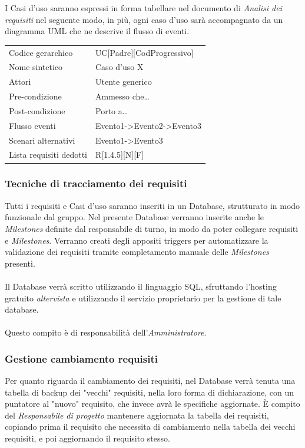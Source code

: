 \documentclass[a4paper]{article}
\begin{document}
			 I Casi d'uso saranno espressi in forma tabellare nel documento di \emph{Analisi dei requisiti}
			 nel seguente modo, in più, ogni caso d'uso sarà accompagnato da un diagramma UML che ne
			 descrive il flusso di eventi.
			 \begin{table}[H]
				\begin{tabularx}{\textwidth}{X | X}\toprule
					\rowcolor{orange!65}Codice gerarchico & UC[Padre][CodProgressivo] \\
					Nome sintetico & Caso d'uso X \\
					\rowcolor{orange!65}Attori & Utente generico\\
					Pre-condizione & Ammesso che\dots \\
					\rowcolor{orange!65}Post-condizione & Porto a\dots \\
					Flusso eventi & Evento1->Evento2->Evento3\\
					\rowcolor{orange!65}Scenari alternativi & Evento1->Evento3\\
					Lista requisiti dedotti & R[1.4.5][N][F]\\
					\bottomrule
				\end{tabularx}
			 \end{table}

		\subsubsection{Tecniche di tracciamento dei requisiti}
			Tutti i requisiti e Casi d'uso saranno inseriti in un Database, strutturato in modo funzionale
			 dal gruppo. Nel presente Database verranno inserite anche le \emph{Milestones} definite
			 dal responsabile di turno, in modo da poter collegare requisiti e \emph{Milestones}. Verranno
			 creati degli appositi triggers per automatizzare la validazione dei requisiti tramite
			  completamento manuale delle \emph{Milestones} presenti.
			\\ \\
			Il Database verrà scritto utilizzando il linguaggio SQL, sfruttando l'hosting gratuito
			\emph{altervista} e utilizzando il servizio proprietario per la gestione di tale database.
			\\ \\
			Questo compito è di responsabilità dell'\emph{Amministratore}.
		\subsubsection{Gestione cambiamento requisiti}
		Per quanto riguarda il cambiamento dei requisiti, nel Database verrà tenuta una tabella di backup dei "vecchi" requisiti,
		nella loro forma di dichiarazione, con un puntatore al "nuovo" requisito, che invece avrà le specifiche aggiornate. È compito del
		\emph{Responsabile di progetto} mantenere aggiornata la tabella dei requisiti, copiando prima il requisito che necessita di cambiamento
		nella tabella dei vecchi requisiti, e poi aggiornando il requisito stesso.
\end{document}
